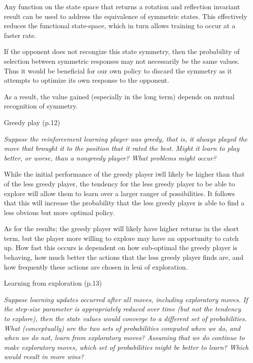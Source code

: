 \documentclass[12pt,letterpaper]{exam}
\begin{document}
\begin{questions}
	\begin{solution}
		Any function on the state space that returns a rotation and reflection invariant result
		can be used to address the equivalence of symmetric states.
		This effectively reduces the functional state-space, which in turn allows training to occur at a faster rate.

		If the opponent does not recongize this state symmetry, then the probability of selection between
		symmetric responses may not necessarily be the same values. Thus it would be beneficial for our own policy
		to discard the symmetry as it attempts to optimize its own response to the opponent.

		As a result, the value gained (especially in the long term) depends on mutual recognition of symmetry.
	\end{solution}

	\question%
	Greedy play (p.12)
	
	\emph{Suppose the reinforcement learning player was greedy, that is, 
	it always played the move that brought it to the position that it rated the best. 
	Might it learn to play better, or worse, than a nongreedy player? What problems might occur?}

	\begin{solution}
		While the initial performance of the greedy player iwll likely be higher than that of 
		the less greedy player, the tendency for the less greedy player to be able to explore
		will allow them to learn over a larger ranger of possibilities.
		It follows that this will increase the probability that the less greedy player is able to 
		find a less obvious but more optimal policy.
		
		As for the results; the greedy player will likely have higher returns in the short term,
		but the player more willing to explore may have an opportunity to catch up.
		How fast this occurs is dependent on how sub-optimal the greedy player is behaving,
		how much better the actions that the less greedy player finds are,
		and how frequently these actions are chosen in leui of exploration.
	\end{solution}
	
	\question%
	Learning from exploration (p.13)
	
	\emph{Suppose learning updates occurred after all moves, including exploratory moves. 
	If the step-size parameter is appropriately reduced over time (but not the tendency to explore), 
	then the state values would converge to a different set of probabilities. 
	What (conceptually) are the two sets of probabilities computed when we do, and when we do not, learn from exploratory moves? 
	Assuming that we do continue to make exploratory moves, which set of probabilities might be better to learn? Which would result in more wins?}


\end{questions}
\end{document}
